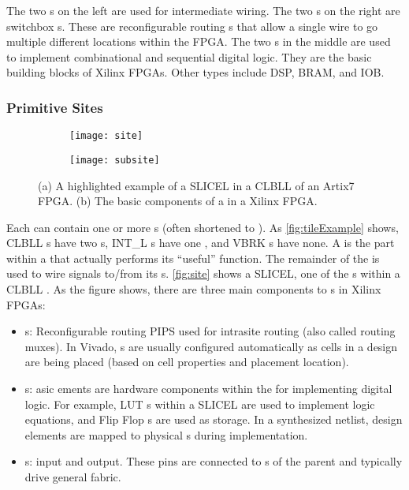 \noindent
The two  s on the left are used for intermediate wiring.
The two  s on the right are switchbox s.
These are reconfigurable routing s that allow a single wire to go
multiple different locations within the FPGA. The two  s
in the middle are used to implement combinational and sequential digital logic.
They are the basic building blocks of Xilinx FPGAs. Other  types
include DSP, BRAM, and IOB.
 
\subsubsection{Primitive Sites}

\begin{figure}[b!]
\centering
   \begin{subfigure}[b!]{0.65\textwidth}
   \texttt{[image: site]}
   \caption{}
   \label{fig:site1} 
\end{subfigure}

\begin{subfigure}[b!]{0.65\textwidth}
   \texttt{[image: subsite]}
   \caption{}
   \label{fig:site2}
\end{subfigure}

\caption{(a) A highlighted example of a SLICEL  in a CLBLL 
of an Artix7 FPGA. (b) The basic components of a  in a
Xilinx FPGA.}
\label{fig:site}
\end{figure}

Each  can contain one or more s (often shortened
to ). As \autoref{fig:tileExample} shows, CLBLL s
have two s, INT\_L s have one , and VBRK s
have none. A  is the part within a  that actually performs
its ``useful'' function. The remainder of the  is used to wire signals
to/from its s. \autoref{fig:site} shows a SLICEL, one of the
s within a CLBLL . As the figure shows, there are three main
components to s in Xilinx FPGAs:

\begin{itemize}
  \item {} s: Reconfigurable routing PIPS used for intrasite
  routing (also called routing muxes). In Vivado,  s are usually configured
  automatically as cells in a design are being placed (based on cell properties
  and placement location).
  \item {}s: asic ements are hardware components within
  the  for implementing digital logic. For example, LUT s within a SLICEL
  are used to implement logic equations, and Flip Flop s are used
  as storage. In a synthesized netlist, design elements are mapped to physical
  s during implementation.
  \item {}s:  input and output. These pins are connected
  to s of the parent  and typically drive general
  fabric.
\end{itemize}

